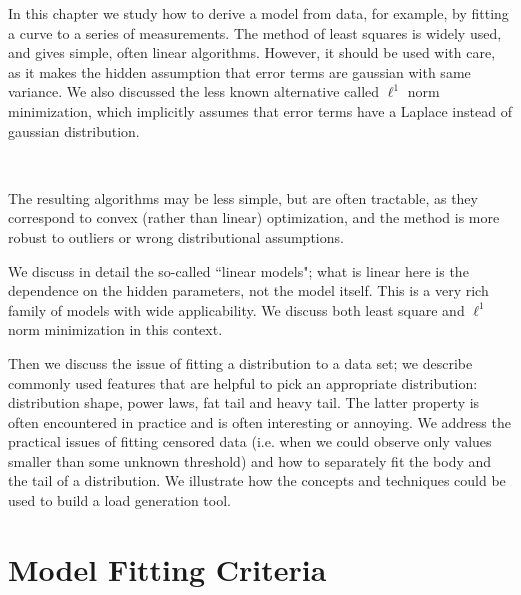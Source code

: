 \begin{minipage}[b]{0.35\textwidth}
In this chapter we study how to derive a model from data, for
example, by fitting a curve to a series of measurements. The
method of least squares is widely used, and gives simple, often
linear algorithms. However, it should be used with care, as it
makes the hidden assumption that error terms are gaussian with
same variance. We also discussed the less known alternative
called $\ell^1$ norm minimization, which implicitly assumes
that error terms have a Laplace instead of gaussian
distribution.
\end{minipage}
%
\begin{minipage}[b]{0.65\textwidth}
\hspace{1cm} ~~~~
 ~\\
\end{minipage}
The resulting algorithms may be less simple, but
are often tractable, as they correspond to convex
(rather than linear) optimization, and the method
is more robust to outliers or wrong
distributional assumptions.

We discuss in detail the so-called ``linear
models"; what is linear here is the dependence on
the hidden parameters, not the model itself. This
is a very rich family of models with wide
applicability. We discuss both least square and
$\ell^1$ norm minimization in this context.

Then we discuss the issue of fitting a distribution to a data
set; we describe commonly used features that are helpful to
pick an appropriate distribution: distribution shape, power
laws, fat tail and heavy tail. The latter property is often
encountered in practice and is often interesting or annoying.
We address the practical issues of fitting censored data (i.e.
when we could observe only values smaller than some unknown
threshold) and how to separately fit the body and the tail of a
distribution. We illustrate how the concepts and techniques
could be used to build a load generation tool.
%
\minitoc
%
\section{Model Fitting Criteria}
